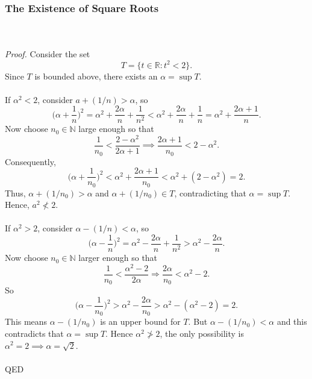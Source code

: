 \documentclass{article}
\begin{document}
    \subsubsection{The Existence of Square Roots}
        \\ \\
        \textit{Proof.} Consider the set
        \begin{equation*}
            T = \{t \in \mathbb{R}: t^2 < 2\}.
        \end{equation*}
        Since $T$ is bounded above, there exists an $\alpha = \sup T$.\\ \\
        If $\alpha^2 < 2$, consider $a+(1/n) > \alpha$, so
        \begin{equation*}
            \bigg( \alpha + \frac{1}{n} \bigg)^2 = \alpha^2 + \frac{2\alpha}{n}+\frac{1}{n^2} < \alpha^2 + \frac{2\alpha}{n}+\frac{1}{n} = \alpha^2 + \frac{2\alpha+1}{n}.
        \end{equation*}
        Now choose $n_0 \in \mathbb{N}$ large enough so that
        \begin{equation*}
            \frac{1}{n_0} < \frac{2-\alpha^2}{2\alpha+1} \implies \frac{2\alpha+1}{n_0} < 2-\alpha^2.
        \end{equation*}
        Consequently,
        \begin{equation*}
            \bigg( \alpha + \frac{1}{n_0} \bigg)^2 < \alpha^2 + \frac{2\alpha+1}{n_0} < \alpha^2 + (2-\alpha^2) = 2.
        \end{equation*}
        Thus, $\alpha + (1/n_0) > \alpha$ and $\alpha + (1/n_0) \in T$, contradicting that $\alpha = \sup T$. Hence, $a^2 \nless 2$.\\ \\
        If $\alpha^2 > 2$, consider $\alpha - (1/n) < \alpha$, so
        \begin{equation*}
            \bigg(\alpha - \frac{1}{n}\bigg)^2 = \alpha^2 - \frac{2\alpha}{n} + \frac{1}{n^2} > \alpha^2 - \frac{2\alpha}{n}.
        \end{equation*}
        Now choose $n_0 \in \mathbb{N}$ larger enough so that
        \begin{equation*}
            \frac{1}{n_0} < \frac{\alpha^2 - 2}{2\alpha} \Rightarrow \frac{2\alpha}{n_0} < \alpha^2 -2.
        \end{equation*}
        So 
        \begin{equation*}
            \bigg(\alpha-\frac{1}{n_0}\bigg)^2 > \alpha^2 - \frac{2\alpha}{n_0} > \alpha^2 - (\alpha^2 -2) = 2.
        \end{equation*}
        This means $\alpha - (1/n_0)$ is an upper bound for $T$. But $\alpha - (1/n_0) < \alpha$ and this contradicts that $\alpha = \sup T$. Hence $\alpha^2 \ngtr 2$, the only possibility is $\alpha^2 = 2 \implies \alpha=\sqrt{2}$.\\ \\
        QED\\
        
\end{document}
